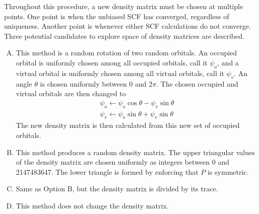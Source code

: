 \documentclass[final,3p,times,twocolumn]{elsarticle}
\begin{document}
Throughout this procedure, a new density matrix must be chosen at multiple points. One point is when the unbiased SCF has converged, regardless of uniqueness. Another point is whenever either SCF calculations do not converge. Three potential candidates to explore space of density matrices are described.
\begin{enumerate}[A.]
\item This method is a random rotation of two random orbitals. An occupied orbital is uniformly chosen among all occupied orbitals, call it $\psi_o$, and a virtual orbital is uniformly chosen among all virtual orbitals, call it $\psi_v$. An angle $\theta$ is chosen uniformly between $0$ and $2\pi$. The chosen occupied and virtual orbitals are then changed to
\begin{subequations}
\begin{gather}
\psi_o \leftarrow \psi_o \cos\theta - \psi_v \sin\theta \\
\psi_v \leftarrow \psi_o \sin\theta + \psi_v \sin\theta
\end{gather} 
\end{subequations}
The new density matrix is then calculated from this new set of occupied orbitals.

\item This method produces a random density matrix. The upper triangular values of the density matrix are chosen uniformly as integers between 0 and 2147483647. The lower triangle is formed by enforcing that $P$ is symmetric.

\item Same as Option B, but the density matrix is divided by its trace.

\item This method does not change the density matrix.

\end{enumerate}

%
\end{document}
